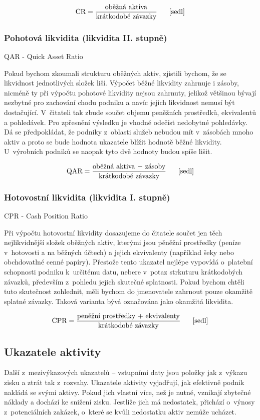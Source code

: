 $$\vz{CR}{oběžná aktiva}{krátkodobé závazky} \scite{sedl}$$

\subsubsection{Pohotová likvidita (likvidita II. stupně)} 
QAR - Quick Asset Ratio

Pokud bychom zkoumali strukturu oběžných aktiv, zjistili bychom, že se likvidnost jednotlivých složek liší. Výpočet běžné likvidity zahrnuje i zásoby, nicméně ty při výpočtu pohotové likvidity nejsou zahrnuty, jelikož většinou bývají nezbytné pro zachování chodu podniku a navíc jejich likvidnost nemusí být dostačující.
V~čitateli tak zbude součet objemu peněžních prostředků, ekvivalentů a pohledávek. Pro zpřesnění výsledku je vhodné odečíst nedobytné pohledávky.
Dá se předpokládat, že podniky z~oblasti služeb nebudou mít v~zásobách mnoho aktiv a proto se bude hodnota ukazatele blížit hodnotě běžné likvidity. U~výrobních podniků se naopak tyto dvě hodnoty budou spíše lišit.

$$\vz{QAR}{oběžná aktiva $-$ zásoby}{krátkodobé závazky} \scite{sedl}$$

\subsubsection{Hotovostní likvidita (likvidita I. stupně)}
CPR - Cash Position Ratio

Při výpočtu hotovostní likvidity dosazujeme do čitatele součet jen těch nejlikvidnější složek oběžných aktiv, kterými jsou pěněžní prostředky (peníze v~hotovosti a na běžných účtech) a jejich ekvivalenty (například šeky nebo obchdovatlné cenné papíry).
Přestože tento ukazatel nejlépe vypovídá o~platební schopnosti podniku k~určitému datu, nebere v~potaz strkuturu krátkodobých závazků, především z~pohledu jejich skutečné splatnosti\cite{mendelu}. Pokud bychom chtěli tuto skutečnost zohlednit, měli bychom do jmenovatele zahrnout pouze okamžitě splatné závazky. Taková varianta bývá označována jako okamžitá likvidita.


$$\vz{CPR}{peněžní prostředky $+$ ekvivalenty}{krátkodobé závazky} \scite{sedl}$$








\subsection{Ukazatele aktivity}
Další z~mezivýkazových ukazatelů -- vstupními daty jsou položky jak z~výkazu zisku a ztrát tak z~rozvahy. Ukazatele aktivity vyjadřují, jak efektivně podnik nakládá se svými aktivy. Pokud jich vlastní více, než je nutné, vznikají zbytečné náklady a dochází ke snižení zisku. Jestliže jich má nedostatek, přichází o~výnosy z~potenciálních zakázek, o~které se kvůli nedostatku aktiv nemůže ucházet.

